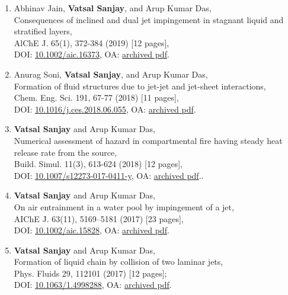 \documentclass[10pt,a4paper,colorlinks,linkcolor=blue,urlcolor=blue,citecolor=blue]{moderncv}
\begin{document}
\begin{enumerate}[leftmargin=0.75cm]
	\item Abhinav Jain, \textbf{Vatsal Sanjay}, and Arup Kumar Das,\\
	Consequences of inclined and dual jet impingement in stagnant liquid and stratified layers,\\
	AlChE J. 65(1), 372-384  (2019) [12 pages],\\
	DOI: \href{https://doi.org/10.1002/aic.16373}{{10.1002/aic.16373}}, OA: \href{https://tinyurl.com/24p5dy8s}{{archived pdf}}.

	\item Anurag Soni, \textbf{Vatsal Sanjay}, and Arup Kumar Das,\\
	Formation of fluid structures due to jet-jet and jet-sheet interactions,\\
	Chem. Eng. Sci. 191, 67-77  (2018) [11 pages],\\
	DOI: \href{https://doi.org/10.1016/j.ces.2018.06.055}{{10.1016/j.ces.2018.06.055}}, OA: \href{https://tinyurl.com/2bv5fznd}{{archived pdf}}.

	\item \textbf{Vatsal Sanjay} and Arup Kumar Das,\\
	Numerical assessment of hazard in compartmental fire having steady heat release rate from the source,\\
	Build. Simul. 11(3), 613-624  (2018) [12 pages],\\
	DOI: \href{https://doi.org/10.1007/s12273-017-0411-y}{{10.1007/s12273-017-0411-y}}, OA: \href{https://tinyurl.com/2bwhzlzv}{{archived pdf}}..

	\item \textbf{Vatsal Sanjay} and Arup Kumar Das,\\
	On air entrainment in a water pool by impingement of a jet,\\
	AIChE J. 63(11), 5169--5181  (2017) [23 pages],\\
	DOI: \href{https://doi.org/10.1002/aic.15828}{{10.1002/aic.15828}}, OA: \href{https://tinyurl.com/24ne4oql}{{archived pdf}}.

	\item \textbf{Vatsal Sanjay} and Arup Kumar Das,\\
	Formation of liquid chain by collision of two laminar jets,\\
	Phys. Fluids 29, 112101  (2017) [12 pages];\\
	DOI: \href{https://doi.org/10.1063/1.4998288}{{10.1063/1.4998288}}, OA: \href{https://tinyurl.com/27sd7lgo}{{archived pdf}}.

\end{enumerate}
\end{document}
